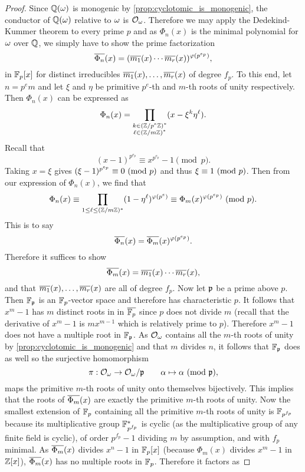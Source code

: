     \begin{proof}
      Since $\mathbb{Q}(\omega)$ is monogenic by \cref{prop:cyclotomic_is_monogenic}, the conductor of $\mathbb{Q}(\omega)$ relative to $\omega$ is $\mathcal{O}_{\omega}$. Therefore we may apply the Dedekind-Kummer theorem to every prime $p$ and as $\Phi_{n}(x)$ is the minimal polynomial for $\omega$ over $\mathbb{Q}$, we simply have to show the prime factorization
      \[
        \overline{\Phi_{n}}(x) = (\overline{m_{1}}(x) \cdots \overline{m_{r}}(x))^{\varphi(p^{e_{p}})},
      \]
      in $\mathbb{F}_{p}[x]$ for distinct irreducibles $\overline{m_{1}}(x),\ldots,\overline{m_{r}}(x)$ of degree $f_{p}$. To this end, let $n = p^{e}m$ and let $\xi$ and $\eta$ be primitive $p^{e}$-th and $m$-th roots of unity respectively. Then $\Phi_{n}(x)$ can be expressed as
      \[
        \Phi_{n}(x) = \prod_{\substack{k \in (\mathbb{Z}/p^{e}\mathbb{Z})^{\ast} \\ \ell \in (\mathbb{Z}/m\mathbb{Z})^{\ast}}}(x-\xi^{k}\eta^{\ell}).
      \]
      Recall that
      \[
        (x-1)^{p^{e_{p}}} \equiv x^{p^{e_{p}}}-1 \pmod{p}.
      \]
      Taking $x = \xi$ gives $(\xi-1)^{p^{e_{p}}} \equiv 0 \ (\mathrm{mod}\text{ }p)$ and thus $\xi \equiv 1 \ (\mathrm{mod}\text{ }p)$. Then from our expression of $\Phi_{n}(x)$, we find that
      \[
        \Phi_{n}(x) \equiv \prod_{1 \le \ell \le (\mathbb{Z}/m\mathbb{Z})^{\ast}}(1-\eta^{\ell})^{\varphi(p^{e})} \equiv \Phi_{m}(x)^{\varphi(p^{e_{p}})} \ (\mathrm{mod}\text{ }p).
      \]
      This is to say
      \[
        \overline{\Phi_{n}}(x) = \overline{\Phi_{m}}(x)^{\varphi(p^{e_{p}})}.
      \]
      Therefore it suffices to show
      \[
        \overline{\Phi_{m}}(x) = \overline{m_{1}}(x) \cdots \overline{m_{r}}(x),
      \]
      and that $\overline{m_{1}}(x),\ldots,\overline{m_{r}}(x)$ are all of degree $f_{p}$. Now let $\mathfrak{p}$ be a prime above $p$. Then $\mathbb{F}_{\mathfrak{p}}$ is an $\mathbb{F}_{p}$-vector space and therefore has characteristic $p$. It follows that $x^{m}-1$ has $m$ distinct roots in in $\overline{\mathbb{F}_{p}}$ since $p$ does not divide $m$ (recall that the derivative of $x^{m}-1$ is $mx^{m-1}$ which is relatively prime to $p$). Therefore $x^{m}-1$ does not have a multiple root in $\mathbb{F}_{\mathfrak{p}}$. As $\mathcal{O}_{\omega}$ contains all the $m$-th roots of unity by \cref{prop:cyclotomic_is_monogenic} and that $m$ divides $n$, it follows that $\mathbb{F}_{\mathfrak{p}}$ does as well so the surjective homomorphism
      \[
        \pi:\mathcal{O}_{\omega} \to \mathcal{O}_{\omega}/\mathfrak{p} \qquad \alpha \mapsto \alpha \ (\mathrm{mod}\text{ }\mathfrak{p}),
      \]
      maps the primitive $m$-th roots of unity onto themselves bijectively. This implies that the roots of $\overline{\Phi_{m}}(x)$ are exactly the primitive $m$-th roots of unity. Now the smallest extension of $\mathbb{F}_{p}$ containing all the primitive $m$-th roots of unity is $\mathbb{F}_{p^{f_{p}}}$ because its multiplicative group $\mathbb{F}_{p^{f_{p}}}^{\ast}$ is cyclic (as the multiplicative group of any finite field is cyclic), of order $p^{f_{p}}-1$ dividing $m$ by assumption, and with $f_{p}$ minimal. As $\overline{\Phi_{m}}(x)$ divides $x^{n}-1$ in $\mathbb{F}_{p}[x]$ (because $\Phi_{m}(x)$ divides $x^{m}-1$ in $\mathbb{Z}[x]$), $\overline{\Phi_{m}}(x)$ has no multiple roots in $\mathbb{F}_{p}$. Therefore it factors as

\end{proof}
